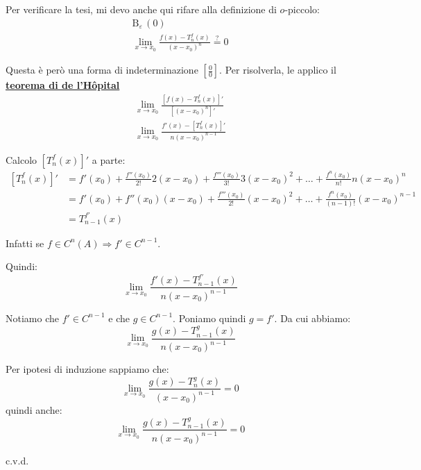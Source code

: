 \documentclass[../../dimostrazioni]{subfiles}
\begin{document}
                Per verificare la tesi, mi devo anche qui rifare alla definizione di \(o\)-piccolo:
                \begin{gather*}
                    \mathrm{B}_\varepsilon \, (0)\\
                    \lim_{x \to x_0} \frac{f(x)-T _n ^ f (x)}{(x-x_0)^n} \stackrel{?}{=} 0
                \end{gather*}

                Questa è però una forma di indeterminazione \(\left[\frac{0}{0}\right]\). Per risolverla, le applico il \textbf{\hyperref[teoHopital]{teorema di de l'Hôpital}}
                \begin{gather*}
                    \lim_{x \to x_0} \frac{\left[f(x)-T _n ^ f (x)\right]'}{\left[(x-x_0)^n\right]'}\\
                    \lim_{x \to x_0} \frac{f'(x)-\left[T _n ^ f (x)\right]'}{n(x-x_0)^{n-1}}
                \end{gather*}

                Calcolo \(\left[T _n ^ f (x)\right]'\) a parte:
                \begin{align*}
                    \left[T _n ^ f (x)\right]' &= f'(x_0) + \frac{f''(x_0)}{2!}2(x-x_0) + \frac{f'''(x_0)}{3!}3(x-x_0)^2 + \dots + \frac{f^n(x_0)}{n!}n(x-x_0)^n \\
                                            &= f'(x_0) + f''(x_0)(x-x_0) + \frac{f'''(x_0)}{2!}(x-x_0)^2 + \dots + \frac{f^n(x_0)}{(n-1)!}(x-x_0)^{n-1} \\
                                            &= T_{n-1} ^{f'} (x)
                \end{align*}

                Infatti se \(f \in C^n (A) \Rightarrow f' \in C^{n-1} \).

                Quindi:
                \[  \lim_{x \to x_0} \frac{f'(x)-T_{n-1} ^{f'} (x)}{n(x-x_0)^{n-1}}    \]

                Notiamo che \(f' \in C^{n-1}\) e che \(g \in C^{n-1}\). Poniamo quindi \(g = f'\). Da cui abbiamo:
                \[  \lim_{x \to x_0} \frac{g(x)-T_{n-1} ^{g} (x)}{n(x-x_0)^{n-1}}    \]

                Per ipotesi di induzione sappiamo che:
                \[  \lim_{x \to x_0} \frac{g(x) - T _n ^ g (x)}{(x-x_0)^{n-1}} = 0 \]
                quindi anche:
                \[  \lim_{x \to x_0} \frac{g(x)-T_{n-1} ^{g} (x)}{n(x-x_0)^{n-1}}  = 0  \]

                c.v.d.
\end{document}
